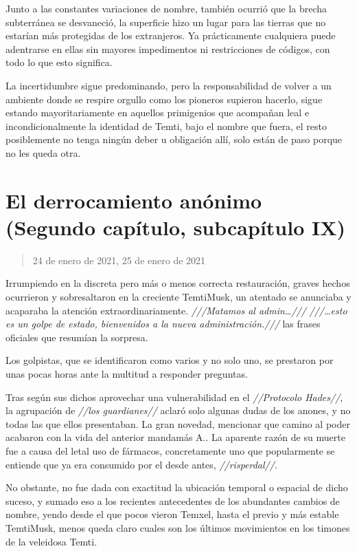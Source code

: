 \documentclass[
  spanish,
]{book}
\begin{document}
Junto a las constantes variaciones de nombre, también ocurrió que la brecha subterránea se desvaneció, la superficie hizo un lugar para las tierras que no estarían más protegidas de los extranjeros. Ya prácticamente cualquiera puede adentrarse en ellas sin mayores impedimentos ni restricciones de códigos, con todo lo que esto significa.

La incertidumbre sigue predominando, pero la responsabilidad de volver a un ambiente donde se respire orgullo como los pioneros supieron hacerlo, sigue estando mayoritariamente en aquellos primigenios que acompañan leal e incondicionalmente la identidad de Temti, bajo el nombre que fuera, el resto posiblemente no tenga ningún deber u obligación allí, solo están de paso porque no les queda otra.

\hypertarget{el-derrocamiento-anuxf3nimo-segundo-capuxedtulo-subcapuxedtulo-ix}{%
\section{El derrocamiento anónimo (Segundo capítulo, subcapítulo IX)}\label{el-derrocamiento-anuxf3nimo-segundo-capuxedtulo-subcapuxedtulo-ix}}

\begin{quote}
24 de enero de 2021, 25 de enero de 2021
\end{quote}

Irrumpiendo en la discreta pero más o menos correcta restauración, graves hechos ocurrieron y sobresaltaron en la creciente TemtiMusk, un atentado se anunciaba y acaparaba la atención extraordinariamente. \emph{///Matamos al admin\ldots///} \emph{///\ldots esto es un golpe de estado, bienvenidos a la nueva administración.///} las frases oficiales que resumían la sorpresa.

Los golpistas, que se identificaron como varios y no solo uno, se prestaron por unas pocas horas ante la multitud a responder preguntas.

Tras según sus dichos aprovechar una vulnerabilidad en el \emph{//Protocolo Hades//}, la agrupación de \emph{//los guardianes//} aclaró solo algunas dudas de los anones, y no todas las que ellos presentaban. La gran novedad, mencionar que camino al poder acabaron con la vida del anterior mandamás A.. La aparente razón de su muerte fue a causa del letal uso de fármacos, concretamente uno que popularmente se entiende que ya era consumido por el desde antes, \emph{//risperdal//}.

No obstante, no fue dada con exactitud la ubicación temporal o espacial de dicho suceso, y sumado eso a los recientes antecedentes de los abundantes cambios de nombre, yendo desde el que pocos vieron Temxel, hasta el previo y más estable TemtiMusk, menos queda claro cuales son los últimos movimientos en los timones de la veleidosa Temti.
\end{document}
